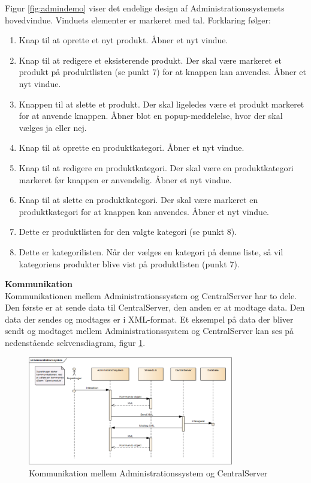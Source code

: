 Figur \ref{fig:admindemo} viser det endelige design af Administrationssystemets hovedvindue. Vinduets elementer er markeret med tal. Forklaring følger:
\begin{enumerate}
	\item Knap til at oprette et nyt produkt. Åbner et nyt vindue.
	\item Knap til at redigere et eksisterende produkt. Der skal være markeret et produkt på produktlisten (se punkt 7) for at knappen kan anvendes. Åbner et nyt vindue.
	\item Knappen til at slette et produkt. Der skal ligeledes være et produkt markeret for at anvende knappen. Åbner blot en popup-meddelelse, hvor der skal vælges ja eller nej.
	\item Knap til at oprette en produktkategori. Åbner et nyt vindue.
	\item Knap til at redigere en produktkategori. Der skal være en produktkategori markeret før knappen er anvendelig. Åbner et nyt vindue.
	\item Knap til at slette en produktkategori. Der skal være markeret en produktkategori for at knappen kan anvendes. Åbner et nyt vindue.
	\item Dette er produktlisten for den valgte kategori (se punkt 8).
	\item Dette er kategorilisten. Når der vælges en kategori på denne liste, så vil kategoriens produkter blive vist på produktlisten (punkt 7).
\end{enumerate}

\textbf{Kommunikation}\\
Kommunikationen mellem Administrationssystem og CentralServer har to dele. Den første er at sende data til CentralServer, den anden er at modtage data. Den data der sendes og modtages er i XML-format. Et eksempel på data der bliver sendt og modtaget mellem Administrationssystem og CentralServer kan ses på nedenstående sekvensdiagram, figur \ref{fig:adminsekvens}.

\begin{figure}[H]
	\centering
	\includegraphics[width=0.8\textwidth]{Projektbeskrivelse/DesignOgImplementering/Images/Administrationssystem-sekvensdiagram}
	\caption{Kommunikation mellem Administrationssystem og CentralServer}
	\label{fig:adminsekvens}
\end{figure}

